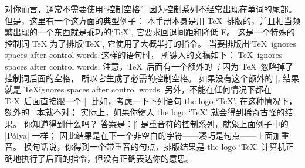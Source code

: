 对你而言，通常不需要使用``控制空格'',
因为控制系列不经常出现在单词的尾部。%
但是，这里有一个这方面的典型例子：
本手册本身是用 \TeX\ 排版的，并且相当频繁出现的一个东西就是乖巧的`\TeX',
它要求回退间距和降低 E。%
这是一个特殊的控制词
\begintt
\TeX
\endtt
为了排版`\TeX', 它使用了大概半打的指令。%
当要排版出`\TeX\ ignores spaces after control words.'\allowbreak 这样的语句时，
所键入的文稿如下：
\begintt
\TeX\ ignores spaces after control words.
\endtt
注意，\TeX\ 后面有一个额外的 |\|; 因为 \TeX\ 忽略掉了控制词后面的空格，
所以它生成了必需的控制空格。%
如果没有这个额外的 |\|, 结果就是
\begindisplay
\TeX ignores spaces after control words.
\enddisplay
\1另外，不能在任何情况下都在 \TeX\ 后面直接跟一个 |\|。%
比如，考虑一下下列语句
\begintt
the logo `\TeX'.
\endtt
在这种情况下，额外的 |\| 根本就不对；
实际上，如果你键入
\begintt
the logo `\TeX\'.
\endtt
就会得到稀奇古怪的结果。
你知道得到什么吗？
答案是：|\'| 是重音符的控制系列，就象上面例子中的 |P\'olya| 一样；
因此结果是在下一个非空白的字符——凑巧是句点——上面加重音。%
换句话说，你得到一个带重音的句点，排版结果是
\begindisplay
the logo `\TeX\'.
\enddisplay
计算机正确地执行了后面的指令，但没有正确表达你的意思。

